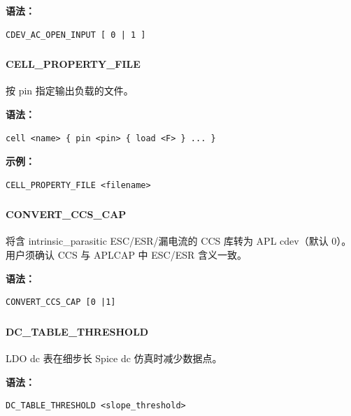 \textbf{语法：}
\begin{lstlisting}
CDEV_AC_OPEN_INPUT [ 0 | 1 ]
\end{lstlisting}

\subsubsection{}
\paragraph*{CELL_PROPERTY_FILE}

按 pin 指定输出负载的文件。

\textbf{语法：}
\begin{lstlisting}
cell <name> { pin <pin> { load <F> } ... }
\end{lstlisting}

\textbf{示例：}
\begin{lstlisting}
CELL_PROPERTY_FILE <filename>
\end{lstlisting}

\subsubsection{}
\paragraph*{CONVERT_CCS_CAP}

将含 intrinsic\_parasitic ESC/ESR/漏电流的 CCS 库转为 APL cdev（默认 0）。用户须确认 CCS 与 APLCAP 中 ESC/ESR 含义一致。

\textbf{语法：}
\begin{lstlisting}
CONVERT_CCS_CAP [0 |1]
\end{lstlisting}

\subsubsection{}
\paragraph*{DC_TABLE_THRESHOLD}

LDO dc 表在细步长 Spice dc 仿真时减少数据点。

\textbf{语法：}
\begin{lstlisting}
DC_TABLE_THRESHOLD <slope_threshold>
\end{lstlisting}

